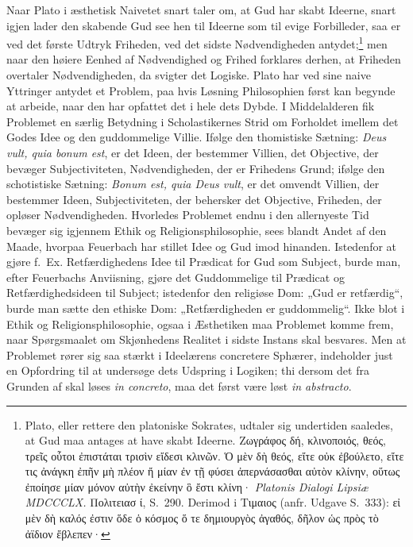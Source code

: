 \documentclass[12pt]{book}
\newcommand{\opage}[1]{\marginnote{\footnotesize\textit{[#1]}}}
\begin{document}
Naar Plato i æsthetisk Naivetet snart taler om, at Gud har skabt Ideerne, snart igjen lader den skabende Gud see hen til Ideerne som til evige Forbilleder, saa er ved det første Udtryk Friheden, ved det sidste Nødvendigheden antydet;\footnote{Plato, eller rettere den platoniske Sokrates, udtaler sig undertiden saaledes, at Gud maa antages at have skabt Ideerne. Ζωγράφος δή, κλινοποιός, θεός, τρεῖς οὗτοι ἐπιστάται τρισὶν εἴδεσι κλινῶν. Ὁ μὲν δὴ θεός, εἴτε οὐκ ἐβούλετο, εἴτε τις ἀνάγκη ἐπῆν μὴ πλέον ἤ μίαν ἐν τῇ φύσει ἀπερνάσασθαι αὐτὸν κλίνην, οὕτως ἐποίησε μίαν μόνον αὐτὴν ἐκείνην ὃ ἔστι κλίνη· \textit{Platonis Dialogi Lipsiæ MDCCCLX.} Πολιτειασ ί, S.~290. Derimod i Τιμαιος (anfr. Udgave S.~333): εἰ μὲν δὴ καλός ἐστιν ὅδε ὁ κόσμος ὅ τε δημιουργὸς ἀγαθός, δῆλον ὡς πρὸς τὸ ἀϊδιον ἔβλεπεν·}%
{} men naar den høiere Eenhed af Nødvendighed og Frihed forklares derhen, at Friheden overtaler Nødvendigheden, da svigter det Logiske. Plato har ved sine naive Yttringer antydet et Problem, paa hvis Løsning Philosophien først kan begynde at arbeide, naar den har opfattet det i hele dets Dybde. I Middelalderen fik Problemet en særlig Betydning i Scholastikernes Strid om Forholdet imellem det Godes Idee og den
\opage{365}guddommelige Villie. Ifølge den thomistiske Sætning: \textit{Deus vult, quia bonum est}, er det Ideen, der bestemmer Villien, det Objective, der bevæger Subjectiviteten, Nødvendigheden, der er Frihedens Grund; ifølge den schotistiske Sætning: \textit{Bonum est, quia Deus vult}, er det omvendt Villien, der bestemmer Ideen, Subjectiviteten, der behersker det Objective, Friheden, der opløser Nødvendigheden. Hvorledes Problemet endnu i den allernyeste Tid bevæger sig igjennem Ethik og Religionsphilosophie, sees blandt Andet af den Maade, hvorpaa Feuerbach har stillet Idee og Gud imod hinanden. Istedenfor at gjøre f.~Ex. Retfærdighedens Idee til Prædicat for Gud som Subject, burde man, efter Feuerbachs Anviisning, gjøre det Guddommelige til Prædicat og Retfærdighedsideen til Subject; istedenfor den religiøse Dom: „Gud er retfærdig“, burde man sætte den ethiske Dom: „Retfærdigheden er guddommelig“. Ikke blot i Ethik og Religionsphilosophie, ogsaa i Æsthetiken maa Problemet komme frem, naar Spørgsmaalet om Skjønhedens Realitet i sidste Instans skal besvares. Men at Problemet rører sig saa stærkt i Ideelærens concretere Sphærer, indeholder just en Opfordring til at undersøge dets Udspring i Logiken; thi dersom det fra Grunden af skal løses \textit{in concreto}, maa det først være løst \textit{in abstracto}.
\end{document}
